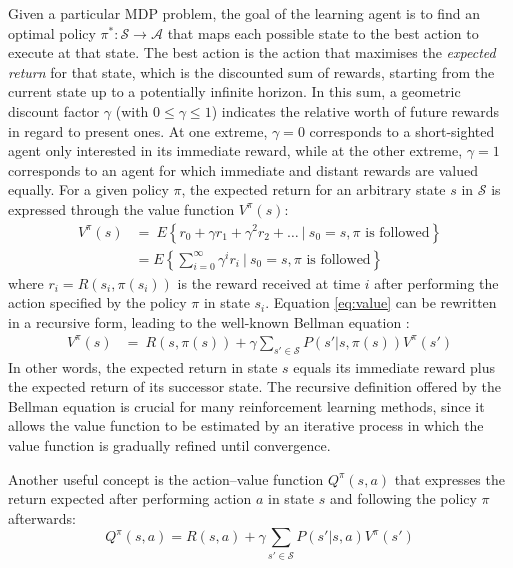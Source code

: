 Given a particular MDP problem, the goal of the learning agent is to find an optimal policy $\pi^*: \mathcal{S} \rightarrow \mathcal{A}$ that maps each possible state to the best action to execute at that state.  The best action is the action that maximises the \textit{expected return} for that state, which is the discounted sum of rewards, starting from the current state up to a potentially infinite horizon.  In this sum, a geometric discount factor $\gamma$ (with $0 \leq \gamma \leq 1$) indicates the relative worth of future rewards in regard to present ones. At one extreme, $\gamma = 0$ corresponds to a short-sighted agent only interested in its immediate reward, while at the other extreme, $\gamma=1$ corresponds to an agent for which immediate and distant rewards are valued equally. For a given policy $\pi$, the expected return for an arbitrary state $s$ in $\mathcal{S}$ is expressed through the value function $V^{\pi}(s)$:
\begin{align}
V^{\pi}(s) & = \  E \left\{ r_0 + \gamma r_1 + \gamma^2 r_2 + \dots \ \big| \ s_0 = s, \pi \text{ is followed} \right\} \\
& = E \left\{\sum_{i=0}^{\infty}  \gamma^i r_{i} \ \bigg| \ s_0 = s, \pi \text{ is followed} \right\} \label{eq:value}
\end{align} 
where $r_i = R(s_i, \pi(s_i))$ is the reward received at time $i$ after performing the action specified by the policy $\pi$  in state $s_i$.  Equation \eqref{eq:value}  can be rewritten in a recursive form, leading to the well-known Bellman equation \citep{Bellman:1957}:
\begin{align}
V^{\pi}(s) & = \    R(s, \pi(s)) + \gamma  \sum_{s' \in \mathcal{S}} P(s'|s,\pi(s)) V^{\pi}(s') \label{eq:bellman}
\end{align} 
In other words, the expected return in state $s$ equals its immediate reward plus the expected return of its successor state.  The recursive definition offered by the Bellman equation is crucial for many reinforcement learning methods, since it allows the value function to be estimated by an iterative process in which the value function is gradually refined until convergence.

Another useful concept is the action--value function $Q^{\pi}(s,a)$ that expresses the return expected after performing action $a$ in state $s$ and following the policy $\pi$ afterwards:
\begin{equation}
Q^{\pi}(s,a) = R(s,a) + \gamma  \sum_{s' \in \mathcal{S}} P(s'|s,a) V^{\pi}(s')
\end{equation}

